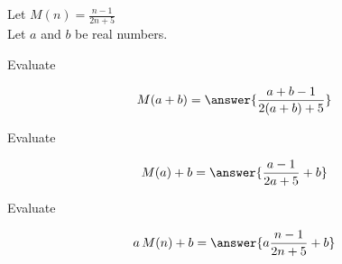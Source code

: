 \documentclass{ximera}
\author{Lee Wayand}
\begin{document}
\begin{exercise}





Let $M(n) = \frac{n-1}{2n+5}$ \\

Let $a$ and $b$ be real numbers. \\





\begin{question}


Evaluate  

\[
M(a+b) = \answer{\frac{a+b-1}{2(a+b)+5}}
\]


\end{question}








\begin{question}


Evaluate  

\[
M(a)+b = \answer{\frac{a-1}{2a+5}+b}
\]


\end{question}









\begin{question}


Evaluate  

\[
a \, M(n)+b = \answer{a \frac{n-1}{2n+5} + b}
\]


\end{question}




















\end{exercise}
\end{document}

